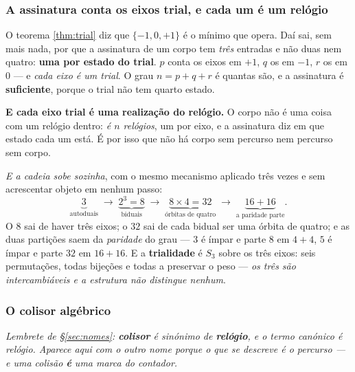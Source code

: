 \documentclass[livro.tex]{subfiles}
\begin{document}
\subsubsection*{A assinatura conta os eixos trial, e cada um é um relógio}

O teorema \ref{thm:trial} diz que $\{-1,0,+1\}$ é o mínimo que opera. Daí sai, sem mais nada, por que a
assinatura de um corpo tem \emph{três} entradas e não duas nem quatro: \textbf{uma por estado do
trial}. $p$ conta os eixos em $+1$, $q$ os em $-1$, $r$ os em $0$ --- e \emph{cada eixo é um trial}. O grau $n=p+q+r$ é quantas são, e a assinatura é \textbf{suficiente}, porque o
trial não tem quarto estado.

\medskip
\noindent \textbf{E cada eixo trial é uma realização do relógio.} O corpo não é uma coisa com
um relógio dentro: \emph{é $n$ relógios}, um por eixo, e a assinatura diz em que estado cada um
está. É por isso que não há corpo sem percurso nem percurso sem corpo.

\medskip
\noindent \emph{E a cadeia sobe sozinha}, com o mesmo mecanismo aplicado três vezes e sem
acrescentar objeto em nenhum passo:
\[
  \underbrace{3}_{\text{autoduais}} \;\longrightarrow\; \underbrace{2^3=8}_{\text{biduais}}
  \;\longrightarrow\; \underbrace{8\times 4 = 32}_{\text{órbitas de quatro}}
  \;\longrightarrow\; \underbrace{16+16}_{\text{a paridade parte}} .
\]
O $8$ sai de haver três eixos; o $32$ sai de cada bidual ser uma órbita de quatro; e as duas
partições saem da \emph{paridade} do grau --- $3$ é ímpar e parte $8$ em $4+4$, $5$ é ímpar e parte
$32$ em $16+16$. E a \textbf{trialidade} é $S_3$ sobre os três eixos: seis permutações, todas
bijeções e todas a preservar o peso --- \emph{os três são intercambiáveis e a estrutura não
distingue nenhum}.


\subsubsection*{O colisor algébrico}

\noindent \emph{Lembrete de \S\ref{sec:nomes}: \textbf{colisor} é sinónimo de \textbf{relógio},
e o termo canónico é relógio. Aparece aqui com o outro nome porque o que se descreve é o
\emph{percurso} --- e uma colisão \textbf{é} uma marca do contador.}
\end{document}
